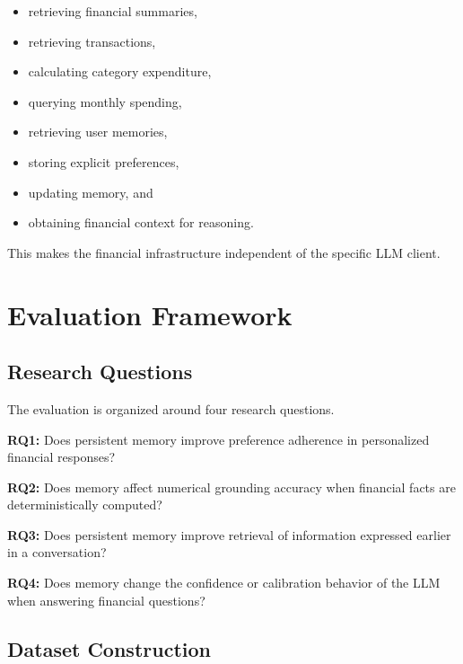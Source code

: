 \documentclass[conference]{IEEEtran}
\begin{document}
    \begin{itemize}
        \item retrieving financial summaries,
        \item retrieving transactions,
        \item calculating category expenditure,
        \item querying monthly spending,
        \item retrieving user memories,
        \item storing explicit preferences,
        \item updating memory, and
        \item obtaining financial context for reasoning.
    \end{itemize}
    
    This makes the financial infrastructure independent of the specific
    LLM client.
    
    
    \section{Evaluation Framework}
    
    \subsection{Research Questions}
    
    The evaluation is organized around four research questions.
    
    \textbf{RQ1:} Does persistent memory improve preference adherence in
    personalized financial responses?
    
    \textbf{RQ2:} Does memory affect numerical grounding accuracy when
    financial facts are deterministically computed?
    
    \textbf{RQ3:} Does persistent memory improve retrieval of information
    expressed earlier in a conversation?
    
    \textbf{RQ4:} Does memory change the confidence or calibration behavior
    of the LLM when answering financial questions?
    
    \subsection{Dataset Construction}
    
\end{document}
